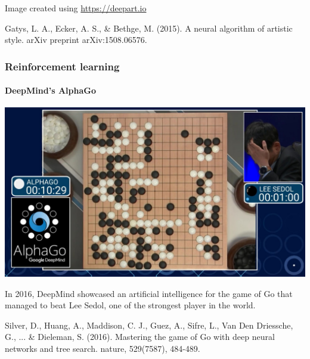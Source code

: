 \documentclass[9pt]{beamer}
\begin{document}
\begin{frame}
  \bigskip

  {\footnotesize Image created using \url{https://deepart.io}}

  \medskip

  {\footnotesize Gatys, L. A., Ecker, A. S., \& Bethge, M. (2015). A
    neural algorithm of artistic style. arXiv preprint
    arXiv:1508.06576.}

\end{frame}





\begin{frame}
  \frametitle{Reinforcement learning}

  \framesubtitle{DeepMind's AlphaGo}

  \begin{center}
    \includegraphics[width=0.65\linewidth]{images/alphago.jpg}
  \end{center}

  \medskip

  In 2016, DeepMind showcased an artificial intelligence for the game
  of Go that managed to beat Lee Sedol, one of the strongest player in
  the world.

  \bigskip

  {\footnotesize Silver, D., Huang, A., Maddison, C. J., Guez, A.,
    Sifre, L., Van Den Driessche, G., ... \& Dieleman,
    S. (2016). Mastering the game of Go with deep neural networks and
    tree search. nature, 529(7587), 484-489.}

\end{frame}
\end{document}
